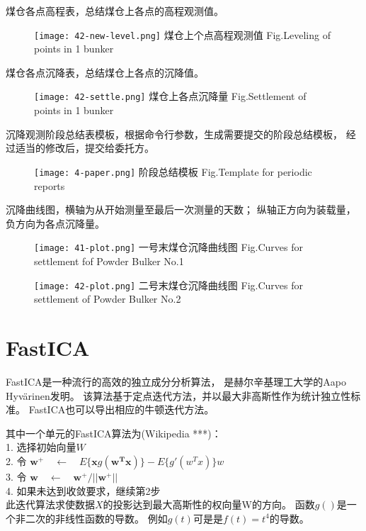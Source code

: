 \newpage
煤仓各点高程表，总结煤仓上各点的高程观测值。
\begin{figure}[!h]
   \centering
   \texttt{[image: 42-new-level.png]}
					{煤仓上个点高程观测值}
			{Fig.}{Leveling of points in 1 bunker}
\end{figure}

煤仓各点沉降表，总结煤仓上各点的沉降值。
\begin{figure}[!h]
   \centering
   \texttt{[image: 42-settle.png]}
					{煤仓上各点沉降量}
			{Fig.}{Settlement of points in 1 bunker}
\end{figure}
\newpage

沉降观测阶段总结表模板，根据命令行参数，生成需要提交的阶段总结模板，
经过适当的修改后，提交给委托方。
\begin{figure}[!h]
   \centering
   \texttt{[image: 4-paper.png]}
				    {阶段总结模板}
			{Fig.}{Template for periodic reports}
\end{figure}

沉降曲线图，横轴为从开始测量至最后一次测量的天数；
纵轴正方向为装载量，负方向为各点沉降量。
\begin{figure}[!h]
   \centering
   \texttt{[image: 41-plot.png]}
				    {一号末煤仓沉降曲线图}
			{Fig.}{Curves for settlement fof Powder Bulker No.1}
\end{figure}

\begin{figure}[!h]
   \centering
   \texttt{[image: 42-plot.png]}
				    {二号末煤仓沉降曲线图}
			{Fig.}{Curves for settlement of Powder Bulker No.2}
\end{figure}

\section{FastICA}
FastICA是一种流行的高效的独立成分分析算法，
是赫尔辛基理工大学的Aapo Hyvärinen发明。
该算法基于定点迭代方法，并以最大非高斯性作为统计独立性标准。
FastICA也可以导出相应的牛顿迭代方法。

其中一个单元的FastICA算法为(Wikipedia ***)：\\
	1. 选择初始向量$W$ \\
	2. 令 $\bm{w}^{+} \quad \leftarrow 
			\quad E\{\bm{x}g(\bm{w^Tx})\} - E\{g'(w^Tx)\}w$ \\
	3. 令 $\bm{w} \quad \leftarrow \quad 
			\bm{w}^{+}/||\bm{w}^{+}||$ \\
	4. 如果未达到收敛要求，继续第2步 \\
此迭代算法求使数据$X$的投影达到最大高斯性的权向量W的方向。
函数$g()$是一个非二次的非线性函数的导数。
例如$g(t)$可是是$f(t)=t^4$的导数。

